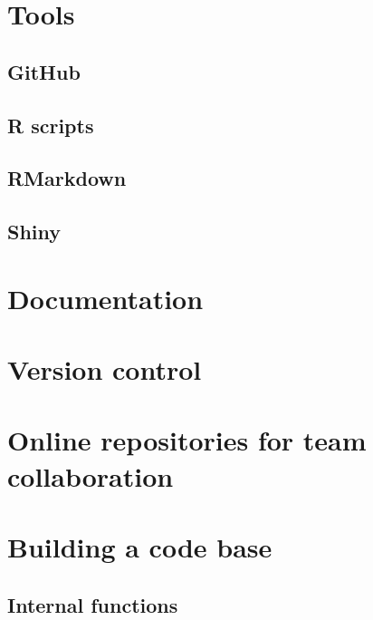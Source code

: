 \documentclass[
]{book}
\begin{document}
\hypertarget{tools}{%
\section{Tools}\label{tools}}

\hypertarget{github}{%
\subsection{GitHub}\label{github}}

\hypertarget{r-scripts}{%
\subsection{R scripts}\label{r-scripts}}

\hypertarget{rmarkdown}{%
\subsection{RMarkdown}\label{rmarkdown}}

\hypertarget{shiny}{%
\subsection{Shiny}\label{shiny}}

\hypertarget{documentation}{%
\section{Documentation}\label{documentation}}

\hypertarget{version-control}{%
\section{Version control}\label{version-control}}

\hypertarget{online-repositories-for-team-collaboration}{%
\section{Online repositories for team collaboration}\label{online-repositories-for-team-collaboration}}

\hypertarget{building-a-code-base}{%
\section{Building a code base}\label{building-a-code-base}}

\hypertarget{internal-functions}{%
\subsection{Internal functions}\label{internal-functions}}
\end{document}
